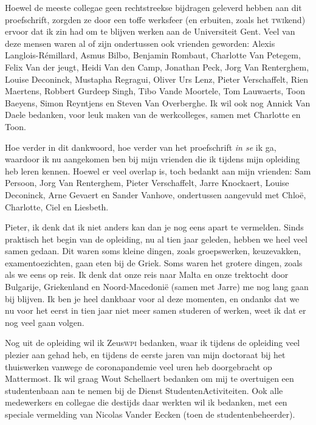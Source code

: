 \documentclass[main]{subfiles}
\begin{document}
Hoewel de meeste collegae geen rechtstreekse bijdragen geleverd hebben aan dit proefschrift, zorgden ze door een toffe werksfeer (en erbuiten, zoals het \textsc{twi}kend) ervoor dat ik zin had om te blijven werken aan de Universiteit Gent.
Veel van deze mensen waren al of zijn ondertussen ook vrienden geworden: Alexis Langlois-Rémillard, Asmus Bilbo, Benjamin Rombaut, Charlotte Van Petegem, Felix Van der jeugt, Heidi Van den Camp, Jonathan Peck, Jorg Van Renterghem, Louise Deconinck, Mustapha Regragui, Oliver Urs Lenz, Pieter Verschaffelt, Rien Maertens, Robbert Gurdeep Singh, Tibo Vande Moortele, Tom Lauwaerts, Toon Baeyens, Simon Reyntjens en Steven Van Overberghe.
Ik wil ook nog Annick Van Daele bedanken, voor leuk maken van de werkcolleges, samen met Charlotte en Toon.

Hoe verder in dit dankwoord, hoe verder van het proefschrift \textit{in se} ik ga, waardoor ik nu aangekomen ben bij mijn vrienden die ik tijdens mijn opleiding heb leren kennen.
Hoewel er veel overlap is, toch bedankt aan mijn vrienden: Sam Persoon, Jorg Van Renterghem, Pieter Verschaffelt, Jarre Knockaert, Louise Deconinck, Arne Gevaert en Sander Vanhove, ondertussen aangevuld met Chloë, Charlotte, Ciel en Liesbeth.

Pieter, ik denk dat ik niet anders kan dan je nog eens apart te vermelden.
Sinds praktisch het begin van de opleiding, nu al tien jaar geleden, hebben we heel veel samen gedaan.
Dit waren soms kleine dingen, zoals groepswerken, keuzevakken, examentoezichten, gaan eten bij de Griek.
Soms waren het grotere dingen, zoals als we eens op reis.
Ik denk dat onze reis naar Malta en onze trektocht door Bulgarije, Griekenland en Noord-Macedonië (samen met Jarre) me nog lang gaan bij blijven.
Ik ben je heel dankbaar voor al deze momenten, en ondanks dat we nu voor het eerst in tien jaar niet meer samen studeren of werken, weet ik dat er nog veel gaan volgen.

Nog uit de opleiding wil ik Zeus\textsc{wpi} bedanken, waar ik tijdens de opleiding veel plezier aan gehad heb, en tijdens de eerste jaren van mijn doctoraat bij het thuiswerken vanwege de coronapandemie veel uren heb doorgebracht op Mattermost.
Ik wil graag Wout Schellaert bedanken om mij te overtuigen een studentenbaan aan te nemen bij de Dienst StudentenActiviteiten.
Ook alle medewerkers en collegae die destijds daar werkten wil ik bedanken, met een speciale vermelding van Nicolas Vander Eecken (toen de studentenbeheerder).
\end{document}
